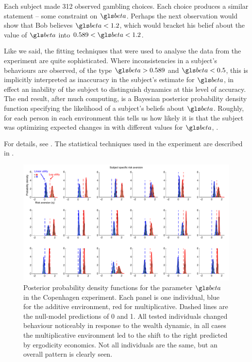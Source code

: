 Each subject made 312 observed gambling choices. Each choice produces a similar statement -- some
constraint on $\gbeta$. 
Perhaps the next observation would show that Bob believes $\gbeta<1.2$, which would 
bracket his belief about the value of $\gbeta $ into $0.589<\gbeta<1.2$. 

Like we said, the fitting techniques that were used to analyse the data from the experiment 
are quite sophisticated. Where inconsistencies in a subject's behaviours are observed, 
\eg of the type $\gbeta>0.589$ and $\gbeta<0.5$, this is implicitly interpreted 
as inaccuracy in the subject's estimate for $\gbeta$, in effect an inability of the subject to 
distinguish dynamics at this level of accuracy. The end result, after much computing, is a 
Bayesian posterior probability density function specifying the likelihood of a subject's beliefs
about $\gbeta$. Roughly, for each person in each environment this tells us how likely it is that the 
subject was optimizing expected changes in  with different values for $\gbeta$, .

For details, see \cite{MederETAL2019}. The statistical techniques used in the experiment
are described in \cite{LeeWagenmakers2013}.


\begin{figure}
    \includegraphics[width=\textwidth]{./chapter_real/figs/CPH_eta.pdf}
    \caption{Posterior probability density functions for the parameter $\gbeta$ in the Copenhagen 
    experiment. Each panel is one individual, blue for the additive environment, red for 
    multiplicative. Dashed lines are the null-model predictions of 0 and 1. All tested individuals 
    changed behaviour noticeably in response to the wealth dynamic, in all cases the 
    multiplicative environment led to the shift to the right predicted by ergodicity economics. 
    Not all individuals are the same, but an overall pattern is clearly seen.}
    \label{fig:HulmeETAL}
\end{figure}

